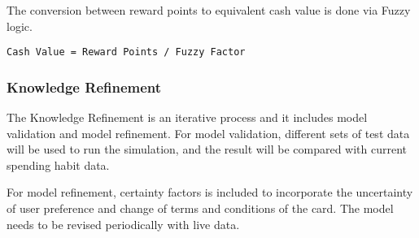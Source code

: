 		The conversion between reward points to equivalent cash value is done via Fuzzy logic.

		\begin{lstlisting}[frame=single, gobble=11, tabsize=4, showstringspaces=false, mathescape]
			Cash Value = Reward Points / Fuzzy Factor
		\end{lstlisting}


	\subsubsection{Knowledge Refinement} %
	\label{ssub:knowledge_refinement}
		The Knowledge Refinement is an iterative process and it includes model validation and model refinement. For model validation, different sets of test data will be used to run the simulation, and the result will be compared with current spending habit data.

		For model refinement, certainty factors is included to incorporate the uncertainty of user preference and change of terms and conditions of the card. The model needs to be revised periodically with live data.


